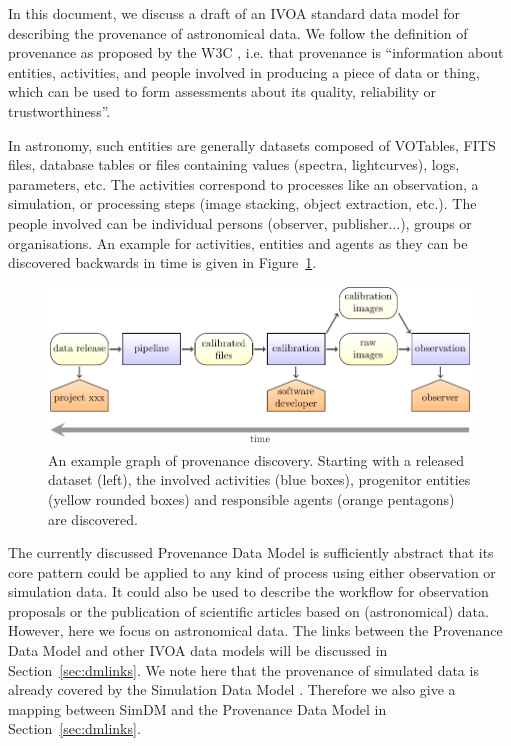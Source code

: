 
In this document, we discuss a draft of an IVOA standard data model for
describing the provenance of astronomical data. 
We follow the definition of provenance as proposed by the W3C \citep{std:W3CProvDM}, i.e. that provenance is ``information about entities, activities, and people involved in producing a piece of data or thing, which can be used to form assessments about its quality, reliability or trustworthiness''.

In astronomy, such entities are generally datasets composed of VOTables, FITS files, database tables or files containing values (spectra, lightcurves), logs, parameters, etc. The activities correspond to processes like an observation, a simulation, or processing steps (image stacking, object extraction, etc.). The people involved can be individual persons (observer, publisher...), groups or organisations.
An example for activities, entities and agents as they can be discovered backwards in time is given in Figure~\ref{fig:example-workflow}.

\begin{figure}[h]
\centering
\includegraphics[width=1\textwidth]{workflow-backwards.pdf}
\caption[Example graph of provenance discovery]{An example graph of provenance discovery. Starting with a released dataset (left), the involved activities (blue boxes), 
progenitor entities (yellow rounded boxes) and responsible agents (orange pentagons) are 
discovered.}
\label{fig:example-workflow}
\end{figure}


The currently discussed Provenance Data Model is sufficiently abstract that its core pattern could be applied to any kind of process using either observation or simulation data.
It could also be used to describe the workflow for observation proposals or the publication of scientific articles based on (astronomical) data. However, here we focus on astronomical data. The links between the Provenance Data Model and other IVOA data models 
will be discussed in Section~\ref{sec:dmlinks}. We note here that the provenance of simulated data is already covered by the Simulation Data Model
\citep[SimDM,][]{std:SimDM}. Therefore we also give a mapping between SimDM and the Provenance Data Model in Section~\ref{sec:dmlinks}.


